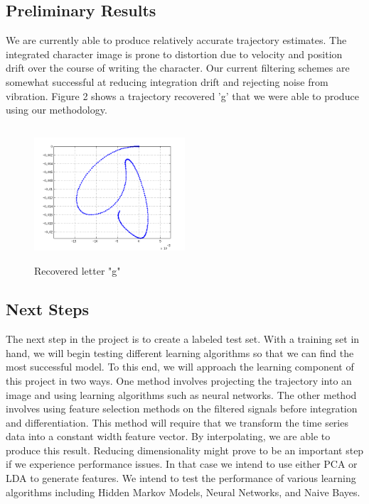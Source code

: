 \documentclass{article}
\begin{document}
\subsection{Preliminary Results}
We are currently able to produce relatively accurate trajectory estimates. The integrated character image is prone to distortion due to velocity and position drift over the course of writing the character. Our current filtering schemes are somewhat successful at reducing integration drift and rejecting noise from vibration. Figure 2 shows a trajectory recovered 'g' that we were able to produce using our methodology.

\begin{figure}[H]
\centering
    \includegraphics[width=0.5\textwidth, height= 5cm]{g.png}
    \caption{Recovered letter "g"}
\end{figure}


\subsection{Next Steps}
The next step in the project is to create a labeled test set. With a training set in hand, we will begin testing different learning algorithms so that we can find the most successful model. To this end, we will approach the learning component of this project in two ways. One method involves projecting the trajectory into an image and using learning algorithms such as neural networks. The other method involves using feature selection methods on the filtered signals before integration and differentiation. This method will require that we transform the time series data into a constant width feature vector. By interpolating, we are able to produce this result. Reducing dimensionality might prove to be an important step if we experience performance issues. In that case we intend to use either PCA or LDA to generate features. We intend to test the performance of various learning algorithms including Hidden Markov Models, Neural Networks, and Naive Bayes.
 
\end{document}
